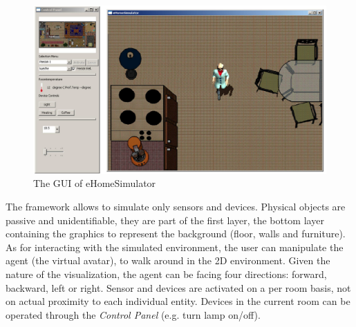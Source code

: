 \begin{figure}[H]
	\centering
	\includegraphics[width=\linewidth]{gfx/Chapter2/simulated_env}
	\caption{The GUI of eHomeSimulator}
	\label{fig:simulated_env}
\end{figure}

The framework allows to simulate only sensors and devices. Physical objects are passive and unidentifiable, they are part of the first layer, the bottom layer containing the graphics to represent the background (floor, walls and furniture).\\

As for interacting with the simulated environment, the user can manipulate the agent (the virtual avatar), to walk around in the 2D environment. Given the nature of the visualization, the agent can be facing four directions: forward, backward, left or right. Sensor and devices are activated on a per room basis, not on actual proximity to each individual entity. Devices in the current room can be operated through the \emph{Control Panel} (e.g. turn lamp on/off).\\
